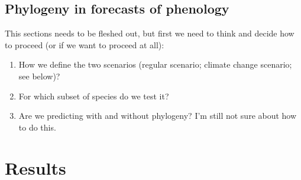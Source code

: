 \documentclass{article}\usepackage[]{graphicx}\usepackage[]{color}
\begin{document}





\subsection*{Phylogeny in forecasts of phenology}
This sections needs to be fleshed out, but first we need to think and decide how to proceed (or if we want to proceed at all):

\begin{enumerate}

\item How we define the two scenarios (regular scenario; climate change scenario; see below)?
\item For which subset of species do we test it?
\item Are we predicting with and without phylogeny? I'm still not sure about how to do this.

\end{enumerate}




\section*{Results}
\end{document}
